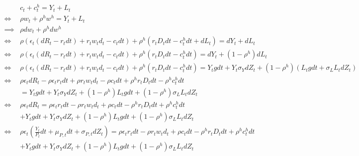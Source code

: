 \documentclass{article}
\begin{document}
\[
    \begin{aligned}
        &c_t + c_t^h = Y_t + L_t\\
        \iff & \rho w_t + \rho^h w^h = Y_t + L_t\\
        \implies & \rho d w_t + \rho^h d w^h \\ %
        \iff &\rho (\epsilon_t (d R_t - r_t d t)  + r_t w_t d_t - c_t d t) + \rho^h(r_t D_t d t  - c_t^h d t + d L_t)= d Y_t + d L_t \\
        \iff &\rho (\epsilon_t (d R_t - r_t d t)  + r_t w_t d_t - c_t d t) + \rho^h(r_t D_t d t  - c_t^h d t)= d Y_t + (1 - \rho^h) d L_t\\
        \iff &\rho (\epsilon_t (d R_t - r_t d t)  + r_t w_t d_t - c_t d t) + \rho^h(r_t D_t d t  - c_t^h d t)= Y_t g d t + Y_t \sigma_Y d Z_t + (1 - \rho^h)(L_t g d t + \sigma_L L_t d Z_t)\\
        \iff &\rho \epsilon_t d R_t - \rho \epsilon_t r_t d t  + \rho r_t w_t d_t - \rho c_t d t + \rho^h r_t D_t d t  - \rho^h c_t^h d t\\
        &= Y_t g d t + Y_t \sigma_Y d Z_t + (1 - \rho^h)L_t g d t + (1 - \rho^h) \sigma_L L_t d Z_t\\
        \iff &\rho \epsilon_t d R_t =  \rho \epsilon_t r_t d t  - \rho r_t w_t d_t + \rho c_t d t - \rho^h r_t D_t d t  + \rho^h c_t^h d t\\
        &+ Y_t g d t + Y_t \sigma_Y d Z_t + (1 - \rho^h)L_t g d t + (1 - \rho^h) \sigma_L L_t d Z_t\\
        \iff & \rho \epsilon_t (\frac{Y_t}{P_t} d t + \mu_{P, t} d t+\sigma_{P, t} d Z_{t}) =  \rho \epsilon_t r_t d t  - \rho r_t w_t d_t + \rho c_t d t - \rho^h r_t D_t d t  + \rho^h c_t^h d t\\
        &+ Y_t g d t + Y_t \sigma_Y d Z_t + (1 - \rho^h)L_t g d t + (1 - \rho^h) \sigma_L L_t d Z_t
    \end{aligned}\]
    
\end{document}
